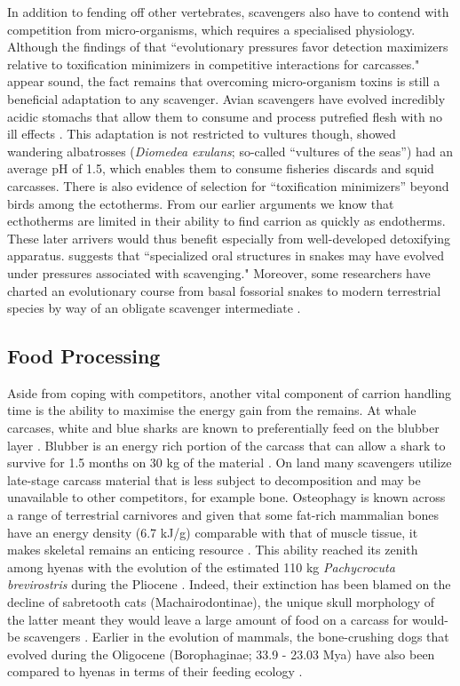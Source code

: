 \documentclass[a4paper,12pt]{article}
\begin{document}
In addition to fending off other vertebrates, scavengers also have to contend with competition from micro-organisms, which requires a specialised physiology. 
Although the findings of \cite{shivik2006vultures} that ``evolutionary pressures favor detection maximizers relative to toxification minimizers in competitive interactions for carcasses." appear sound, the fact remains that overcoming micro-organism toxins is still a beneficial adaptation to any scavenger. 
Avian scavengers have evolved incredibly acidic stomachs that allow them to consume and process putrefied flesh with no ill effects \citep{houston1975digestive,roggenbuck2014microbiome}. 
This adaptation is not restricted to vultures though, \cite{gremillet2012vultures} showed wandering albatrosses (\textit{Diomedea exulans}; so-called ``vultures of the seas'') had an average pH of 1.5, which enables them to consume fisheries discards and squid carcasses. 
There is also evidence of selection for ``toxification minimizers'' beyond birds among the ectotherms.
From our earlier arguments we know that ecthotherms are limited in their ability to find carrion as quickly as endotherms. 
These later arrivers would thus benefit especially from well-developed detoxifying apparatus. 
\cite{shivik2006vultures} suggests that ``specialized oral structures in snakes may have evolved under pressures associated with scavenging."
Moreover, some researchers have charted an evolutionary course from basal fossorial snakes to modern terrestrial species by way of an obligate scavenger intermediate \citep{bauchot2006snakes}. 

\subsection*{Food Processing}
Aside from coping with competitors, another vital component of carrion handling time is the ability to maximise the energy gain from the remains. 
At whale carcases, white and blue sharks are known to preferentially feed on the blubber layer \citep{long1996sharks}. 
Blubber is an energy rich portion of the carcass that can allow a shark to survive for 1.5 months on 30 kg of the material \citep{carey1982temperature}. 
On land many scavengers utilize late-stage carcass material that is less subject to decomposition and may be unavailable to other competitors, for example bone.
Osteophagy is known across a range of terrestrial carnivores and given that some fat-rich mammalian bones have an energy density (6.7 kJ/g) comparable with that of muscle tissue, it makes skeletal remains an enticing resource \citep{brown1989study}.
This ability reached its zenith among hyenas with the evolution of the estimated 110 kg \textit{Pachycrocuta brevirostris} during the Pliocene \citep[3.6 - 2.58 Mya; ][]{palmqvist2011giant}.
Indeed, their extinction has been blamed on the decline of sabretooth cats (Machairodontinae), the unique skull morphology of the latter meant they would leave a large amount of food on a carcass for would-be scavengers \citep{palmqvist2011giant}. 
Earlier in the evolution of mammals, the bone-crushing dogs that evolved during the Oligocene (Borophaginae; 33.9 - 23.03 Mya) have also been compared to hyenas in terms of their feeding ecology \citep{van2003chapter,martin2016pursuit}.
\end{document}
